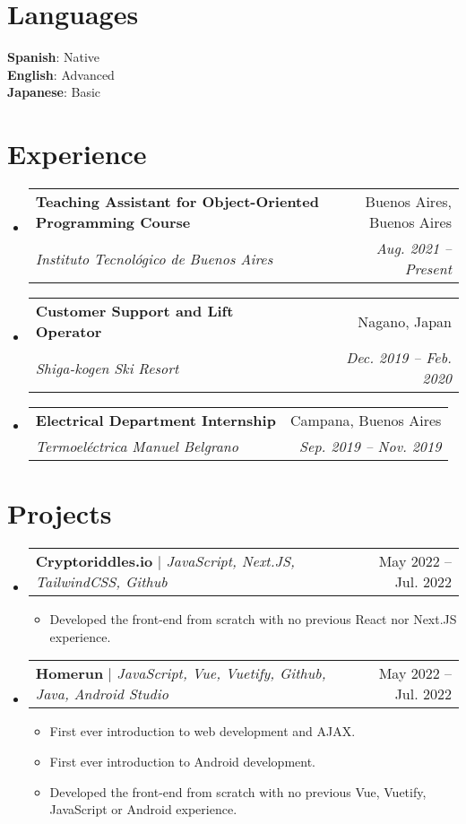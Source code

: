 \documentclass[letterpaper,11pt]{article}
\makeatletter
\newcommand{\resumeItem}[1]{
  \item\small{
    {#1 \vspace{-2pt}}
  }
}
\newcommand{\resumeSubheading}[4]{
  \vspace{-2pt}\item
    \begin{tabular*}{0.97\textwidth}[t]{l@{\extracolsep{\fill}}r}
      \textbf{#1} & #2 \\
      \textit{\small#3} & \textit{\small #4} \\
    \end{tabular*}\vspace{-7pt}
}
\newcommand{\resumeSubSubheading}[2]{
    \item
    \begin{tabular*}{0.97\textwidth}{l@{\extracolsep{\fill}}r}
      \textit{\small#1} & \textit{\small #2} \\
    \end{tabular*}\vspace{-7pt}
}
\newcommand{\resumeProjectHeading}[2]{
    \item
    \begin{tabular*}{0.97\textwidth}{l@{\extracolsep{\fill}}r}
      \small#1 & #2 \\
    \end{tabular*}\vspace{-7pt}
}
\newcommand{\resumeSubHeadingListStart}{\begin{itemize}[leftmargin=0.15in, label={}]}
\newcommand{\resumeSubHeadingListEnd}{\end{itemize}}
\newcommand{\resumeItemListStart}{\begin{itemize}}
\newcommand{\resumeItemListEnd}{\end{itemize}\vspace{-5pt}}
\makeatother
\begin{document}
\section{Languages}
 \begin{itemize}[leftmargin=0.15in, label={}]
    \small{\item{
     \textbf{Spanish}{: Native} \\
     \textbf{English}{: Advanced} \\
     \textbf{Japanese}{: Basic}
    }}
 \end{itemize}


\section{Experience}
  \resumeSubHeadingListStart
  \resumeSubheading
  {Teaching Assistant for Object-Oriented Programming Course}{Buenos Aires, Buenos Aires}
  {Instituto Tecnológico de Buenos Aires}{Aug. 2021 -- Present}
  \resumeSubheading
  {Customer Support and Lift Operator}{Nagano, Japan}
  {Shiga-kogen Ski Resort}{Dec. 2019 -- Feb. 2020}
    \resumeSubheading
    {Electrical Department Internship}{Campana, Buenos Aires}
      {Termoeléctrica Manuel Belgrano}{Sep. 2019 -- Nov. 2019}


   

  \resumeSubHeadingListEnd


\section{Projects}
    \resumeSubHeadingListStart
      \resumeProjectHeading
          {\textbf{Cryptoriddles.io} $|$ \emph{JavaScript, Next.JS, TailwindCSS, Github}}{May 2022 -- Jul. 2022}
          \resumeItemListStart
            \resumeItem{Developed the front-end from scratch with no previous React nor Next.JS experience.}
          \resumeItemListEnd
      \resumeProjectHeading
          {\textbf{Homerun} $|$ \emph{JavaScript, Vue, Vuetify, Github, Java, Android Studio}}{May 2022 -- Jul. 2022}
          \resumeItemListStart
          \resumeItem{First ever introduction to web development and AJAX.}
          \resumeItem{First ever introduction to Android development.}
            \resumeItem{Developed the front-end from scratch with no previous Vue, Vuetify, JavaScript or Android experience.}
          \resumeItemListEnd
    \resumeSubHeadingListEnd
\end{document}
